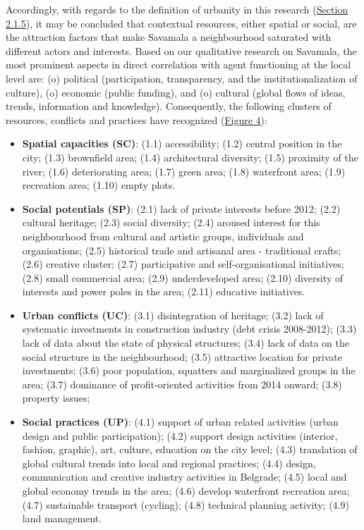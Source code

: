 \documentclass[11pt]{report}
\begin{document}
Accordingly, with regards to the definition of urbanity in this research (\href{Section 2.1.5}{Section 2.1.5}), it may be concluded that contextual resources, either spatial or social, are the attraction factors that make Savamala a neighbourhood saturated with different actors and interests.
Based on our qualitative research on Savamala, the most prominent aspects in direct correlation with agent functioning at the local level are:
(o) political (participation, transparency, and the institutionalization of culture),
(o) economic (public funding),
and
(o) cultural (global flows of ideas, trends, information and knowledge).
Consequently, the following clusters of resources, conflicts and practices have recognized (\href{Figure 4}{Figure 4}):

\begin{itemize}

\item \textbf{Spatial capacities (SC)}: 
(1.1) accessibility;
(1.2) central position in the city;
(1.3) brownfield area;
(1.4) architectural diversity;
(1.5) proximity of the river;
(1.6) deteriorating area;
(1.7) green area;
(1.8) waterfront area;
(1.9) recreation area;
(1.10) empty plots.

\item \textbf{Social potentials (SP)}:
(2.1) lack of private interests before 2012;
(2.2) cultural heritage;
(2.3) social diversity;
(2.4) aroused interest for this neighbourhood from cultural and artistic groups, individuals and organisations;
(2.5) historical trade and artisanal area - traditional crafts;
(2.6) creative cluster;
(2.7) participative and self-organisational initiatives;
(2.8) small commercial area;
(2.9) underdeveloped area;
(2.10) diversity of interests and power poles in the area;
(2.11) educative initiatives.

\item \textbf{Urban conflicts (UC)}:
(3.1) disintegration of heritage;
(3.2) lack of systematic investments in construction industry (debt crisis 2008-2012);
(3.3) lack of data about the state of physical structures;
(3.4) lack of data on the social structure in the neighbourhood;
(3.5) attractive location for private investments;
(3.6) poor population, squatters and marginalized groups in the area;
(3.7) dominance of profit-oriented activities from 2014 onward;
(3.8) property issues;

\item \textbf{Social practices (UP)}:
(4.1) support of urban related activities (urban design and public participation);
(4.2) support design activities (interior, fashion, graphic), art, culture, education on the city level;
(4.3) translation of global cultural trends into local and regional practices;
(4.4) design, communication and creative industry activities in Belgrade;
(4.5) local and global economy trends in the area;
(4.6) develop waterfront recreation area;
(4.7) sustainable transport (cycling);
(4.8) technical planning activity;
(4.9) land management.
\end{itemize}
\end{document}

